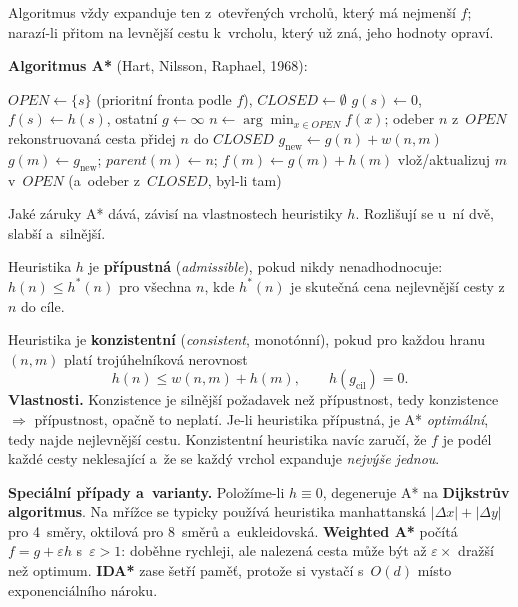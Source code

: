 \documentclass[11pt,a4paper]{article}
\theoremstyle{definition}
\begin{document}
\noindent Algoritmus vždy expanduje ten z~otevřených vrcholů, který má nejmenší $f$; narazí-li
přitom na levnější cestu k~vrcholu, který už zná, jeho hodnoty opraví.

\noindent\textbf{Algoritmus A*} (Hart, Nilsson, Raphael, 1968):
\begin{algorithmic}[1]
\State $\mathit{OPEN} \gets \{s\}$ (prioritní fronta podle $f$), $\mathit{CLOSED} \gets \emptyset$
\State $g(s) \gets 0$, $f(s) \gets h(s)$, ostatní $g \gets \infty$
  \State $n \gets \arg\min_{x \in \mathit{OPEN}} f(x)$; odeber $n$ z~$\mathit{OPEN}$
   \Return rekonstruovaná cesta \EndIf
  \State přidej $n$ do $\mathit{CLOSED}$
    \State $g_{\mathrm{new}} \gets g(n) + w(n,m)$
      \State $g(m) \gets g_{\mathrm{new}}$; $\mathit{parent}(m) \gets n$;
             $f(m) \gets g(m) + h(m)$
      \State vlož/aktualizuj $m$ v~$\mathit{OPEN}$ (a~odeber z~$\mathit{CLOSED}$, byl-li tam)
    \EndIf
  \EndFor
\EndWhile
\State \Return {}
\end{algorithmic}

\medskip
\noindent Jaké záruky A* dává, závisí na vlastnostech heuristiky $h$. Rozlišují se u~ní dvě,
slabší a~silnější.

\begin{defbox}
Heuristika $h$ je \textbf{přípustná} (\emph{admissible}), pokud nikdy nenadhodnocuje:
$h(n) \le h^*(n)$ pro všechna $n$, kde $h^*(n)$ je skutečná cena nejlevnější cesty z~$n$ do cíle.

Heuristika je \textbf{konzistentní} (\emph{consistent}, monotónní), pokud pro každou hranu
$(n,m)$ platí trojúhelníková nerovnost
\[
h(n) \le w(n,m) + h(m), \qquad h(g_{\mathrm{cil}}) = 0 .
\]
\textbf{Vlastnosti.} Konzistence je silnější požadavek než přípustnost, tedy konzistence
$\Rightarrow$ přípustnost, opačně to neplatí. Je-li heuristika přípustná, je A*
\emph{optimální}, tedy najde nejlevnější cestu. Konzistentní heuristika navíc zaručí, že $f$ je
podél každé cesty neklesající a~že se každý vrchol expanduje \emph{nejvýše jednou}.
\end{defbox}

\textbf{Speciální případy a~varianty.} Položíme-li $h \equiv 0$, degeneruje A* na
\textbf{Dijkstrův algoritmus}. Na mřížce se typicky používá heuristika manhattanská
$|\Delta x| + |\Delta y|$ pro 4~směry, oktilová pro 8~směrů a~eukleidovská. \textbf{Weighted A*}
počítá $f = g + \varepsilon h$ s~$\varepsilon > 1$: doběhne rychleji, ale nalezená cesta může být
až $\varepsilon\times$ dražší než optimum. \textbf{IDA*} zase šetří paměť, protože si vystačí
s~$O(d)$ místo exponenciálního nároku.
\end{document}
